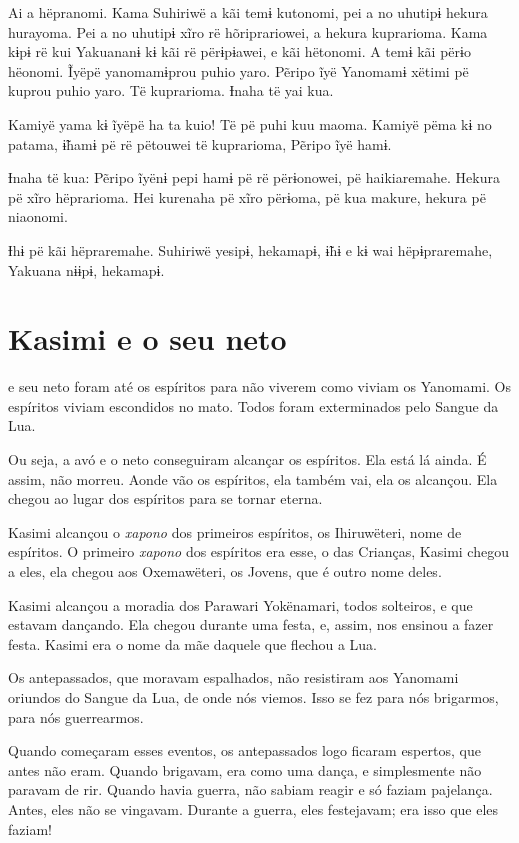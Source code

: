 Ai a hëpranomi. Kama Suhiriwë a kãi temɨ kutonomi, pei a no uhutipɨ
hekura hurayoma. Pei a no uhutipɨ xĩro rë hõriprariowei, a hekura
kuprarioma. Kama kɨpɨ rë kui Yakuananɨ kɨ kãi rë përɨpɨawei, e kãi
hëtonomi. A temɨ kãi përɨo hëonomi. Ĩyëpë yanomamɨprou puhio yaro.
Pẽripo ĩyë Yanomamɨ xëtimi pë kuprou puhio yaro. Të kuprarioma. Ɨnaha të
yai kua.

Kamiyë yama kɨ ĩyëpë ha ta kuio! Të pë puhi kuu maoma. Kamiyë pëma kɨ no
patama, ɨ̃hamɨ pë rë pëtouwei të kuprarioma, Pẽripo ĩyë hamɨ. 

Ɨnaha të kua: Pẽripo ĩyënɨ pepi hamɨ pë rë përɨonowei, pë haikiaremahe.
Hekura pë xĩro hëprarioma. Hei kurenaha pë xĩro përɨoma, pë kua makure,
hekura pë niaonomi. 

Ɨhɨ pë kãi hëpraremahe. Suhiriwë yesipɨ, hekamapɨ, ɨ̃hɨ e kɨ wai
hëpɨpraremahe, Yakuana nɨɨpɨ, hekamapɨ.

\chapter{Kasimi e o seu neto}

 e seu neto foram até os espíritos para não viverem como viviam
os Yanomami. Os espíritos viviam escondidos no mato. Todos foram
exterminados pelo Sangue da Lua.

Ou seja, a avó e o neto conseguiram alcançar os espíritos. Ela está lá ainda. É assim, não morreu. Aonde vão os espíritos, ela também vai, ela os
alcançou. Ela chegou ao lugar dos espíritos para se tornar eterna. 

Kasimi alcançou o \textit{xapono} dos primeiros espíritos, os Ihiruwëteri, nome
de espíritos. O primeiro \textit{xapono} dos espíritos era esse, o das
Crianças, Kasimi chegou a eles, ela chegou aos
Oxemawëteri, os Jovens, que é outro nome deles. 

Kasimi alcançou a moradia dos Parawari Yokënamari, todos solteiros, e que
estavam dançando. Ela chegou durante uma festa, e, assim, nos ensinou a
fazer festa. Kasimi era o nome da mãe daquele que flechou a Lua.

Os antepassados, que moravam espalhados, não resistiram aos Yanomami
oriundos do Sangue da Lua, de onde nós viemos. Isso se fez para nós
brigarmos, para nós guerrearmos. 

Quando começaram esses eventos, os antepassados logo ficaram espertos,
que antes não eram. Quando brigavam, era como uma dança, e
simplesmente não paravam de rir. Quando havia guerra, não sabiam reagir
e {só} faziam pajelança. Antes, eles não se vingavam.
Durante a guerra, eles festejavam; era isso que eles faziam! 

